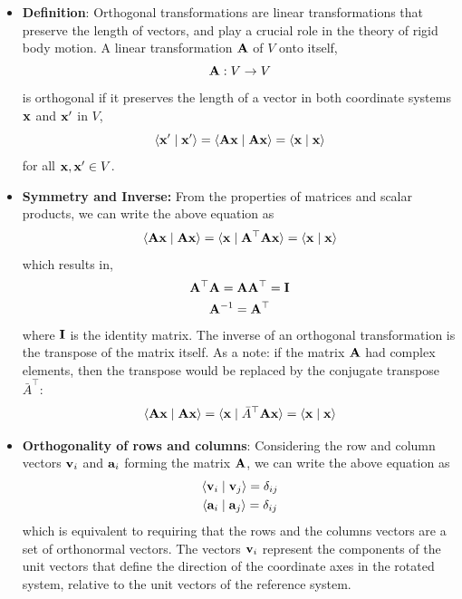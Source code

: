 \documentclass[12pt]{article}
\newcommand{\ip}[2]{\langle #1 \mid #2 \rangle}
\begin{document}
\begin{itemize}
  \item \textbf{Definition}: Orthogonal transformations are linear transformations that
        preserve the length of vectors, and play a crucial role in the theory of rigid body
        motion. A linear transformation $\vb{A}$ of $V$ onto itself,
        \begin{equation}
          \vb{A}: V \to V
        \end{equation}
        is orthogonal if it preserves the length of a vector in both coordinate systems
        $\vb{x}$ and $\vb{x}'$ in $V$,
        \begin{equation}
          \ip{\vb{x}'}{\vb{x}'} = \ip{\vb{A}\vb{x}}{\vb{A}\vb{x}} = \ip{\vb{x}}{\vb{x}}
        \end{equation}
        for all $\vb{x}, \vb{x}' \in V$.

  \item \textbf{Symmetry and Inverse:} From the properties of matrices and scalar products,
        we can write the above equation as
        \begin{equation}
          \ip{\vb{A}\vb{x}}{\vb{A}\vb{x}} = \ip{\vb{x}}{\vb{A}^\top\vb{A}\vb{x}} = \ip{\vb{x}}{\vb{x}}
        \end{equation}
        which results in,
        \begin{equation}
          \begin{gathered}
            \vb{A}^\top\vb{A} = \vb{A}\vb{A}^\top = \vb{I} \\
            \vb{A}^{-1} = \vb{A}^\top
          \end{gathered}
          \label{kinematics:orthogonal-condition}
        \end{equation}
        where $\vb{I}$ is the identity matrix. The inverse of an orthogonal transformation is
        the transpose of the matrix itself. As a note: if the matrix $\vb{A}$ had complex
        elements, then the transpose would be replaced by the conjugate transpose
        $\bar{A}^\top$:
        \begin{equation}
          \ip{\vb{A}\vb{x}}{\vb{A}\vb{x}} = \ip{\vb{x}}{\bar{A}^\top\vb{A}\vb{x}} = \ip{\vb{x}}{\vb{x}}
        \end{equation}

  \item \textbf{Orthogonality of rows and columns}: Considering the row and column vectors
        $\vb{v}_i$ and $\vb{a}_i$ forming the matrix $\vb{A}$, we can write the above
        equation as
        \begin{equation}
          \begin{gathered}
            \ip{\vb{v}_i}{\vb{v}_j} = \delta_{ij} \\
            \ip{\vb{a}_i}{\vb{a}_j} = \delta_{ij}
          \end{gathered}
        \end{equation}
        which is equivalent to requiring that the rows and the columns vectors are a set of
        orthonormal vectors. The vectors $\vb{v}_i$ represent the components of the unit
        vectors that define the direction of the coordinate axes in the rotated system,
        relative to the unit vectors of the reference system.


\end{itemize}
\end{document}
